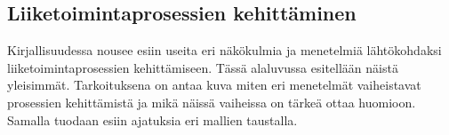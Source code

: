 \documentclass[finnish,12pt,a4paper,pdftex]{article}
\begin{document}

\subsection{Liiketoimintaprosessien kehittäminen}

Kirjallisuudessa nousee esiin useita eri näkökulmia ja menetelmiä lähtökohdaksi  liiketoimintaprosessien kehittämiseen. Tässä alaluvussa esitellään näistä yleisimmät. Tarkoituksena on antaa kuva miten eri menetelmät vaiheistavat prosessien kehittämistä ja mikä näissä vaiheissa on tärkeä ottaa huomioon. Samalla tuodaan esiin ajatuksia eri mallien taustalla.






\end{document}
